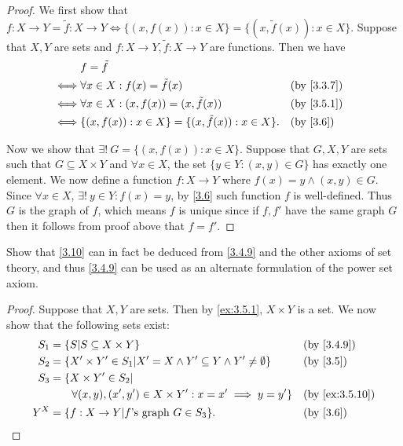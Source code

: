 \begin{proof}
  We first show that \(f : X \to Y = \tilde{f} : X \to Y \iff \{(x, f(x)) : x \in X\} = \{(x, \tilde{f}(x)) : x \in X\}\).
  Suppose that \(X, Y\) are sets and \(f : X \to Y, \tilde{f} : X \to Y\) are functions.
  Then we have
  \begin{align*}
         & f = \tilde{f}                                                                          \\
    \iff & \forall x \in X : f(x) = \tilde{f}(x)                      &  & \by{3.3.7}             \\
    \iff & \forall x \in X : (x, f(x)) = (x, \tilde{f}(x))            &  & \by{3.5.1}             \\
    \iff & \{(x, f(x)) : x \in X\} = \{(x, \tilde{f}(x)) : x \in X\}. &  & \text{(by \cref{3.6})}
  \end{align*}

  Now we show that \(\exists!\ G = \{(x, f(x)) : x \in X\}\).
  Suppose that \(G, X, Y\) are sets such that \(G \subseteq X \times Y\) and \(\forall x \in X\), the set \(\{y \in Y : (x, y) \in G\}\) has exactly one element.
  We now define a function \(f : X \to Y\) where \(f(x) = y \land (x, y) \in G\).
  Since \(\forall x \in X\), \(\exists!\ y \in Y : f(x) = y\), by \cref{3.6} such function \(f\) is well-defined.
  Thus \(G\) is the graph of \(f\), which means \(f\) is unique since if \(f, f'\) have the same graph \(G\) then it follows from proof above that \(f = f'\).
\end{proof}

\begin{ex}\label{ex:3.5.11}
  Show that \cref{3.10} can in fact be deduced from \cref{3.4.9} and the other axioms of set theory, and thus \cref{3.4.9} can be used as an alternate formulation of the power set axiom.
\end{ex}

\begin{proof}
  Suppose that \(X, Y\) are sets.
  Then by \cref{ex:3.5.1}, \(X \times Y\) is a set.
  We now show that the following sets exist:
  \begin{align*}
    S_1 & = \{S | S \subseteq X \times Y\}                                                 &  & \by{3.4.9}             \\
    S_2 & = \{X' \times Y' \in S_1 | X' = X \land Y' \subseteq Y \land Y' \neq \emptyset\} &  & \text{(by \cref{3.5})} \\
    S_3 & = \{X \times Y' \in S_2 |                                                                                    \\
        & \quad\quad \forall (x, y), (x', y') \in X \times Y' : x = x' \implies y = y'\}   &  & \by{ex:3.5.10}         \\
    Y^X & = \{f : X \to Y | f \text{'s graph } G \in S_3\}.                                &  & \text{(by \cref{3.6})}
  \end{align*}
\end{proof}

